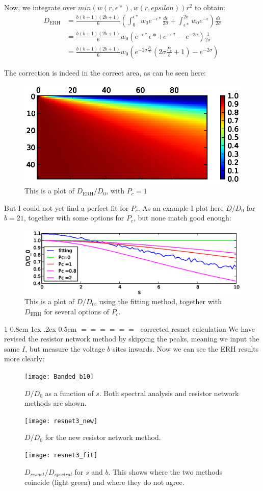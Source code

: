 \documentclass[onecolumn,fleqn,notitlepage,secnumarabic]{revtex4}
\makeatletter
\def\section{%
  \@startsection
    {section}%
    {1}%
    {\z@}%
    {0.8cm \@plus1ex \@minus .2ex}%
    {0.5cm}%
    {\Large\bf $=\!=\!=\!=\!=\!=\;$}%
}%
\makeatother
\begin{document}
Now, we integrate over $min(w(r,\epsilon*),w(r,epsilon))r^2$ to obtain:
\begin{align}
   D_\textrm{ERH} &= \frac{b(b+1)(2b+1)}{6}(\int_0^{\epsilon*}w_0e^{-\epsilon*}\frac{d\epsilon}{2\sigma} +  \int_{\epsilon*}^{2\sigma} w_0e^{-\epsilon})\frac{d\epsilon}{2\sigma} \\
   &= \frac{b(b+1)(2b+1)}{6} w_0\left(e^{-\epsilon*}\epsilon*+e^{-\epsilon*}-e^{-2\sigma}\right)\frac{1}{2\sigma}\\
   &=\frac{b(b+1)(2b+1)}{6} w_0 \left( e^{-2\sigma\frac{P_c}{b}}\left(2\sigma\frac{P_c}{b} + 1\right) - e^{-2\sigma}\right)
\end{align}

The correction is indeed in the correct area, as can be seen here:
\begin{figure}[H]
\includegraphics{BANDED_ERH}
\caption{This is a plot of $D_\textrm{ERH}/D_0$, with $P_c=1$}
\end{figure}

But I could not yet find a perfect fit for $P_c$. As an example I plot here $D/D_0$ for $b=21$, together with some options for $P_c$, but none match good enough:
\begin{figure}[H]
\includegraphics{b21}
\caption{This is a plot of $D/D_0$, using the fitting method, together with $D_\textrm{ERH}$ for several options of $P_c$.}
\end{figure}

\section{corrected resnet calculation}
We have revised the resistor network method by skipping the peaks, meaning we input the same $I$, but measure the voltage $b$ sites inwards. Now we can see the ERH results more clearly:
\begin{figure}[H]
\texttt{[image: Banded\_b10]}
\caption{$D/D_0$ as a function of $s$. Both spectral analysis and resistor network methods are shown. }
\end{figure}
\begin{figure}[H]
\texttt{[image: resnet3\_new]}
\caption{$D/D_0$ for the new resistor network method.}
\end{figure}

\begin{figure}[H]
\texttt{[image: resnet3\_fit]}
\caption{$D_{resnet}/D_{spectral}$  for $s$ and $b$. This shows where the two methods coincide (light green) and where they do not agree.}
\end{figure}
\end{document}
